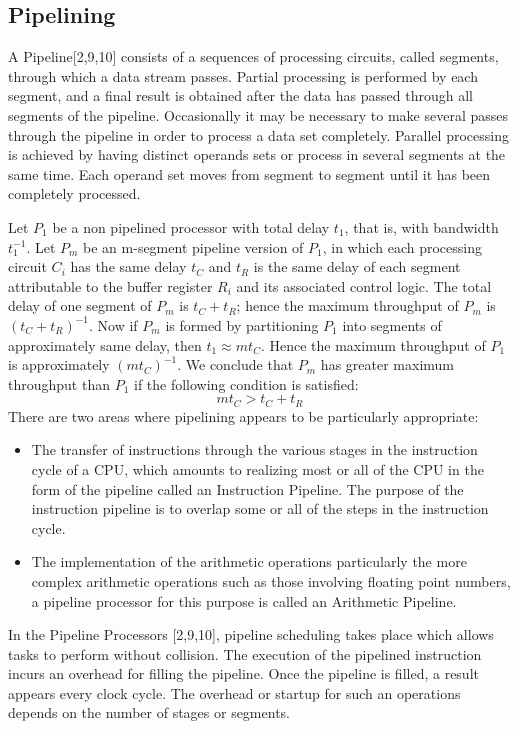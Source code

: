 \subsection{Pipelining}
A Pipeline[2,9,10] consists of a sequences of processing circuits, called segments, through which a data stream passes. Partial processing is
performed by each segment, and a final result is obtained after the data has passed through all segments of the pipeline. Occasionally it may be necessary to
make several passes through the pipeline in order to process a data set completely. Parallel processing is achieved by having distinct operands sets or
process in several segments at the same time. Each operand set moves from segment to segment until it has been completely processed.\par
\hspace{1in}Let $P_{1}$ be a non pipelined processor with total delay $t_{1}$, that is, with bandwidth $t_{1}^{-1}$. Let $P_{m}$ be an m-segment pipeline
version of $P_{1}$, in which each processing circuit $C_{i}$ has the same delay $t_{C}$ and $t_{R}$ is the same delay of each segment attributable to the
buffer register $R_{i}$ and its associated control logic. The total  delay of one segment of $P_{m}$ is $t_{C} + t_{R}$; hence the maximum throughput of
$P_{m}$ is $(t_{C} + t_{R})^{-1}$. Now if $P_{m}$ is formed by partitioning $P_{1}$ into segments of approximately same delay, then $t_{1} \approx mt_{C}$.
Hence the maximum throughput of $P_{1}$ is approximately $(mt_{C})^{-1}$. We conclude that $P_{m}$ has greater maximum throughput than $P_{1}$ if the following
condition is satisfied:
\begin{equation}
mt_{C} > t_{C} + t_{R}
\end{equation}
There are two areas where pipelining appears to be particularly appropriate:\par
\begin{itemize}
\item The transfer of instructions through the various stages in the instruction cycle of a CPU, which amounts to realizing most or all of the CPU in the form
of the pipeline called an Instruction Pipeline. The purpose of the instruction pipeline is to overlap some or all of the steps in the instruction cycle.
\item The implementation of the arithmetic operations particularly the more complex arithmetic operations such as those involving floating point numbers, a
      pipeline processor for this purpose is called an Arithmetic Pipeline.
\end{itemize}
In the Pipeline Processors [2,9,10], pipeline scheduling takes place which allows tasks to perform without collision. The execution of the pipelined
instruction incurs an overhead for filling the pipeline. Once the pipeline is filled, a result appears every clock cycle. The overhead or startup for such an
operations depends on the number of stages or segments.

